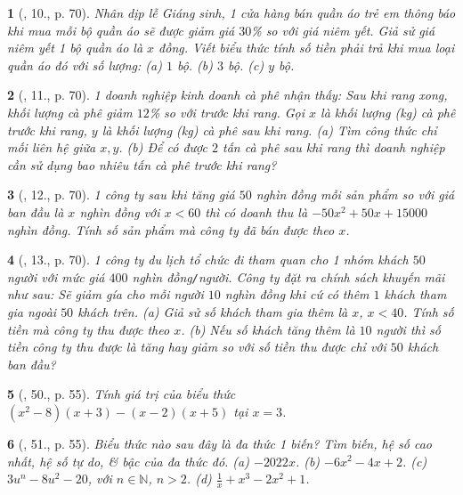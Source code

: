 \documentclass{article}
\newtheorem{baitoan}{}
\begin{document}
\begin{baitoan}[\cite{SGK_Toan_7_Canh_Dieu_tap_2}, 10., p. 70]
	Nhân dịp lễ Giáng sinh, 1 cửa hàng bán quần áo trẻ em thông báo khi mua mỗi bộ quần áo sẽ được giảm giá $30$\% so với giá niêm yết. Giả sử giá niêm yết 1 bộ quần áo là $x$ đồng. Viết biểu thức tính số tiền phải trả khi mua loại quần áo đó với số lượng: (a) $1$ bộ. (b) $3$ bộ. (c) $y$ bộ.
\end{baitoan}

\begin{baitoan}[\cite{SGK_Toan_7_Canh_Dieu_tap_2}, 11., p. 70]
	1 doanh nghiệp kinh doanh cà phê nhận thấy: Sau khi rang xong, khối lượng cà phê giảm $12$\%  so với trước khi rang. Gọi $x$ là khối lượng (kg) cà phê trước khi rang, $y$ là khối lượng (kg) cà phê sau khi rang. (a) Tìm công thức chỉ mối liên hệ giữa $x,y$. (b) Để có được $2$ tấn cà phê sau khi rang thì doanh nghiệp cần sử dụng bao nhiêu tấn cà phê trước khi rang?
\end{baitoan}

\begin{baitoan}[\cite{SGK_Toan_7_Canh_Dieu_tap_2}, 12., p. 70]
	1 công ty sau khi tăng giá $50$ nghìn đồng mỗi sản phẩm so với giá ban đầu là $x$ nghìn đồng với $x < 60$ thì có doanh thu là $-50x^2 + 50x + 15000$ nghìn đồng. Tính số sản phẩm mà công ty đã bán được theo $x$.
\end{baitoan}

\begin{baitoan}[\cite{SGK_Toan_7_Canh_Dieu_tap_2}, 13., p. 70]
	1 công ty du lịch tổ chức đi tham quan cho 1 nhóm khách $50$ người với mức giá $400$ nghìn đồng\emph{\texttt{/}}người. Công ty đặt ra chính sách khuyến mãi như sau: Sẽ giảm gía cho mỗi người $10$ nghìn đồng khi cứ có thêm $1$ khách tham gia ngoài $50$ khách trên. (a) Giả sử số khách tham gia thêm là $x$, $x < 40$. Tính số tiền mà công ty thu được theo $x$. (b) Nếu số khách tăng thêm là $10$ người thì số tiền công ty thu được là tăng hay giảm so với số tiền thu được chỉ với $50$ khách ban đầu?
\end{baitoan}

\begin{baitoan}[\cite{SBT_Toan_7_Canh_Dieu_tap_2}, 50., p. 55]
	Tính giá trị của biểu thức $(x^2 - 8)(x + 3) - (x - 2)(x + 5)$ tại $x = 3$.
\end{baitoan}

\begin{baitoan}[\cite{SBT_Toan_7_Canh_Dieu_tap_2}, 51., p. 55]
	Biểu thức nào sau đây là đa thức 1 biến? Tìm biến, hệ số cao nhất, hệ số tự do, \& bậc của đa thức đó. (a) $-2022x$. (b) $-6x^2 - 4x + 2$. (c) $3u^n - 8u^2 - 20$, với $n\in\mathbb{N}$, $n > 2$. (d) $\frac{1}{x} + x^3 - 2x^2 + 1$.
\end{baitoan}
\end{document}

